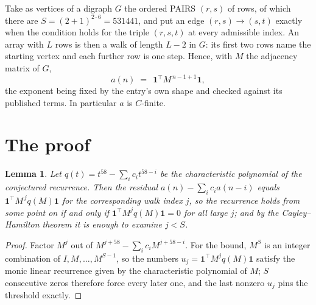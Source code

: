 \documentclass[11pt,a4paper]{article}
\theoremstyle{plain}
\newtheorem{lemma}[theorem]{Lemma}
\theoremstyle{definition}
\begin{document}
Take as vertices of a digraph $G$ the ordered PAIRS $(r,s)$ of rows, of which there are
$S=(2+1)^{2\cdot6}=531441$, and put an edge $(r,s)\to(s,t)$ exactly when the condition
holds for the triple $(r,s,t)$ at every admissible index. An array with $L$ rows is then a
walk of length $L-2$ in $G$: its first two rows name the starting vertex and each further
row is one step. Hence, with $M$ the adjacency matrix of $G$,
\[
a(n)\;=\;\,\mathbf{1}^{\!\top}M^{\,n-1+1}\mathbf{1},
\]
the exponent being fixed by the entry's own shape and checked against its published terms.
In particular $a$ is $C$-finite.

\section{The proof}

\begin{lemma}\label{lem:crit}
Let $q(t)=t^{58}-\sum_i c_it^{58-i}$ be the characteristic polynomial of the
conjectured recurrence. Then the residual $a(n)-\sum_ic_ia(n-i)$ equals
$\mathbf{1}^{\!\top}M^{\,j}q(M)\mathbf{1}$ for the corresponding walk index
$j$, so the recurrence holds from some point on if and only if
$\mathbf{1}^{\!\top}M^{j}q(M)\mathbf{1}=0$ for all large $j$; and by the
Cayley--Hamilton theorem it is enough to examine $j<S$.
\end{lemma}

\begin{proof}
Factor $M^{j}$ out of $M^{j+58}-\sum_ic_iM^{j+58-i}$. For the bound, $M^{S}$
is an integer combination of $I,M,\dots,M^{S-1}$, so the numbers
$u_j=\mathbf{1}^{\!\top}M^{j}q(M)\mathbf{1}$ satisfy the monic linear recurrence given by
the characteristic polynomial of $M$; $S$ consecutive zeros therefore force every later one,
and the last nonzero $u_j$ pins the threshold exactly.
\end{proof}
\end{document}
